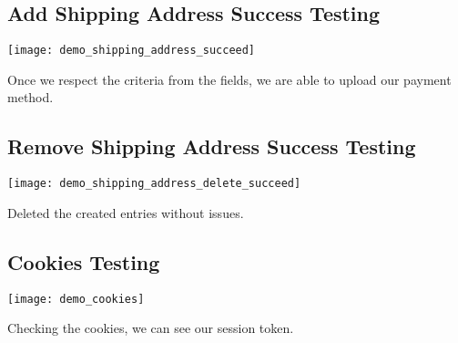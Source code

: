 \subsection[Add Shipping Address Success Testing ]{Add Shipping Address Success Testing}\label{subsec:add-shipping-address-success-testing}
\begin{center}
    \texttt{[image: demo\_shipping\_address\_succeed]}
\end{center}
\begin{flushleft}
    Once we respect the criteria from the fields, we are able to upload our payment method.
\end{flushleft}

\subsection[Remove Shipping Address Success Testing ]{Remove Shipping Address Success Testing}\label{subsec:remove-shipping-address-success-testing}
\begin{center}
    \texttt{[image: demo\_shipping\_address\_delete\_succeed]}
\end{center}
\begin{flushleft}
    Deleted the created entries without issues.
\end{flushleft}

\subsection[Cookies Testing]{Cookies Testing}\label{subsec:cookies-testing}
\begin{center}
    \texttt{[image: demo\_cookies]}
\end{center}
\begin{flushleft}
    Checking the cookies, we can see our session token.
\end{flushleft}

